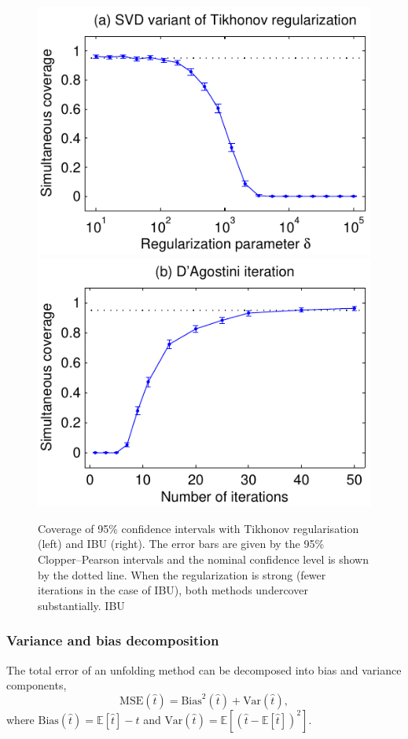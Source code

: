             \begin{figure}
                \centering
                \includegraphics[width=0.5\linewidth]{figures/chapter-02/incJets_lumFactor150nBinsE30nBinsF30JointCoverageSVD.pdf}\includegraphics[width=0.5\linewidth]{figures/chapter-02/incJets_lumFactor150nBinsE30nBinsF30JointCoverageDAgostini.pdf}
                \caption[Coverage properties of Tikhonov regularisation and IBU]{Coverage of 95\% confidence intervals with Tikhonov regularisation (left) and IBU (right).
                The error bars are given by the 95\% Clopper–Pearson intervals and the nominal confidence level is shown by the dotted line.
                When the regularization is strong (fewer iterations in the case of IBU), both methods undercover substantially. IBU~\cite{kuusela_shape-constrained_2017}}
                \label{fig:coverage}
            \end{figure}
    \subsubsection{Variance and bias decomposition}
        The total error of an unfolding method can be decomposed into bias and variance components,
        \begin{equation}
        \text{MSE}(\hat{t}) = \text{Bias}^2(\hat{t}) + \text{Var}(\hat{t}),
        \end{equation}
        where \(\text{Bias}(\hat{t}) = \mathbb{E}[\hat{t}] - t\) and \(\text{Var}(\hat{t}) = \mathbb{E}[(\hat{t} - \mathbb{E}[\hat{t}])^2]\). 
        
